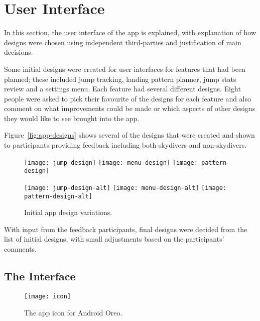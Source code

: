 \section{User Interface}\label{sec:user-interface}
In this section, the user interface of the app is explained, with explanation of how designs were chosen using independent third-parties and justification of main decisions.

Some initial designs were created for user interfaces for features that had been planned; these included jump tracking, landing pattern planner, jump stats review and a settings menu. Each feature had several different designs. Eight people were asked to pick their favourite of the designs for each feature and also comment on what improvements could be made or which aspects of other designs they would like to see brought into the app.

Figure~\vref{fig:app-designs} shows several of the designs that were created and shown to participants providing feedback including both skydivers and non-skydivers.

\begin{figure}[ht]
  \centering
  \texttt{[image: jump-design]}
  \hspace{1cm}
  \texttt{[image: menu-design]}
  \hspace{1cm}
  \texttt{[image: pattern-design]}

  \texttt{[image: jump-design-alt]}
  \hspace{1cm}
  \texttt{[image: menu-design-alt]}
  \hspace{1cm}
  \texttt{[image: pattern-design-alt]}
  \caption{Initial app design variations.}\label{fig:app-designs}
\end{figure}

With input from the feedback participants, final designs were decided from the list of initial designs, with small adjustments based on the participants' comments.

\subsection{The Interface}

\begin{wrapfigure}{}{0.2\textwidth}
  \centering
  \texttt{[image: icon]}
  \caption{The app icon for Android Oreo.}\label{fig:icon}
\end{wrapfigure}

